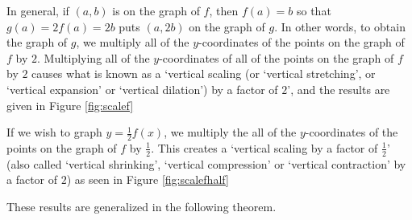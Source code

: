 
In general, if $(a,b)$ is on the graph of $f$, then $f(a) = b$ so that $g(a) = 2 f(a) = 2b$ puts $(a,2b)$ on the graph of $g$.  In other words, to obtain the graph of $g$, we multiply all of the $y$-coordinates of the points on the graph of $f$ by $2$.  Multiplying all of the $y$-coordinates of all of the points on the graph of $f$ by $2$ causes what is known as a `vertical scaling (or `vertical stretching', or `vertical expansion' or `vertical dilation') by a factor of $2$', and the results are given in Figure \ref{fig:scalef} 

If we wish to graph $y = \frac{1}{2} f(x)$, we multiply the all of the $y$-coordinates of the points on the graph of $f$ by $\frac{1}{2}$.  This creates a `vertical scaling  by a factor of $\frac{1}{2}$' (also called `vertical shrinking', `vertical compression' or `vertical contraction' by a factor of $2$) as seen in Figure \ref{fig:scalefhalf}



These results are generalized in the following theorem.

\smallskip


